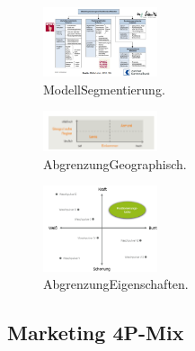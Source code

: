 \documentclass[../ZF_Wing.tex]{subfiles}
\begin{document}
\begin{multicols}{3}

\begin{figure}[H]
\centering
\includegraphics[width=0.3\textwidth]{Resources/Image/ModellSegmentierung.png}
\caption{\label{fig:ModellSegmentierung}ModellSegmentierung.}
\end{figure}


\columnbreak
\begin{figure}[H]
\centering
\includegraphics[width=0.3\textwidth]{Resources/Image/AbgrenzungGeographisch.png}
\caption{\label{fig:BegriffMarketing}AbgrenzungGeographisch.}
\end{figure}

\columnbreak
\begin{figure}[H]
\centering
\includegraphics[width=0.3\textwidth]{Resources/Image/AbgrenzungEigenschaften.png}
\caption{\label{fig:AbgrenzungEigenschaften}AbgrenzungEigenschaften.}
\end{figure}



\end{multicols}

\subsection{Marketing 4P-Mix}
\end{document}
